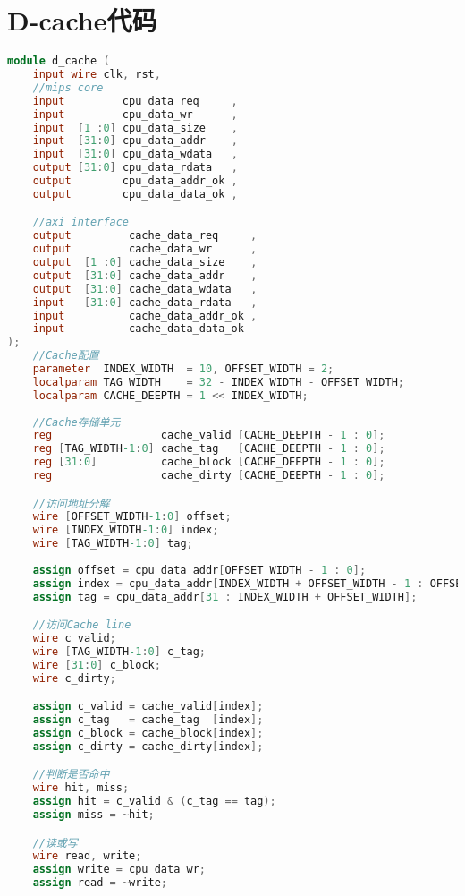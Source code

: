 \appendix
\section{D-cache代码}

\begin{lstlisting}[language=Verilog,frame=single]
module d_cache (
    input wire clk, rst,
    //mips core
    input         cpu_data_req     ,
    input         cpu_data_wr      ,
    input  [1 :0] cpu_data_size    ,
    input  [31:0] cpu_data_addr    ,
    input  [31:0] cpu_data_wdata   ,
    output [31:0] cpu_data_rdata   ,
    output        cpu_data_addr_ok ,
    output        cpu_data_data_ok ,

    //axi interface
    output         cache_data_req     ,
    output         cache_data_wr      ,
    output  [1 :0] cache_data_size    ,
    output  [31:0] cache_data_addr    ,
    output  [31:0] cache_data_wdata   ,
    input   [31:0] cache_data_rdata   ,
    input          cache_data_addr_ok ,
    input          cache_data_data_ok 
);
    //Cache配置
    parameter  INDEX_WIDTH  = 10, OFFSET_WIDTH = 2;
    localparam TAG_WIDTH    = 32 - INDEX_WIDTH - OFFSET_WIDTH;
    localparam CACHE_DEEPTH = 1 << INDEX_WIDTH;
    
    //Cache存储单元
    reg                 cache_valid [CACHE_DEEPTH - 1 : 0];
    reg [TAG_WIDTH-1:0] cache_tag   [CACHE_DEEPTH - 1 : 0];
    reg [31:0]          cache_block [CACHE_DEEPTH - 1 : 0];
    reg                 cache_dirty [CACHE_DEEPTH - 1 : 0];

    //访问地址分解
    wire [OFFSET_WIDTH-1:0] offset;
    wire [INDEX_WIDTH-1:0] index;
    wire [TAG_WIDTH-1:0] tag;
    
    assign offset = cpu_data_addr[OFFSET_WIDTH - 1 : 0];
    assign index = cpu_data_addr[INDEX_WIDTH + OFFSET_WIDTH - 1 : OFFSET_WIDTH];
    assign tag = cpu_data_addr[31 : INDEX_WIDTH + OFFSET_WIDTH];

    //访问Cache line
    wire c_valid;
    wire [TAG_WIDTH-1:0] c_tag;
    wire [31:0] c_block;
    wire c_dirty;

    assign c_valid = cache_valid[index];
    assign c_tag   = cache_tag  [index];
    assign c_block = cache_block[index];
    assign c_dirty = cache_dirty[index];

    //判断是否命中
    wire hit, miss;
    assign hit = c_valid & (c_tag == tag);
    assign miss = ~hit;

    //读或写
    wire read, write;
    assign write = cpu_data_wr;
    assign read = ~write;


\end{lstlisting}
